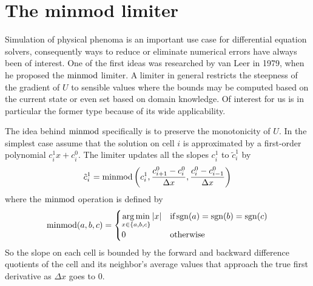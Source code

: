 \section{The minmod limiter}
\label{sec:minmod}

Simulation of physical phenoma is an important use case for differential equation solvers, consequently ways to reduce or eliminate numerical errors have always been of interest.
One of the first ideas was researched by van Leer in 1979, when he proposed the $\operatorname{minmod}$ limiter\cite{VanLeer1979}.
A limiter in general restricts the steepness of the gradient of $U$ to sensible values where the bounds may be computed based on the current state or even set based on domain knowledge.
Of interest for us is in particular the former type because of its wide applicability.

The idea behind $\operatorname{minmod}$ specifically is to preserve the monotonicity of $U$.
In the simplest case assume that the solution on cell $i$ is approximated by a first-order polynomial $c_{i}^{1}x + c_{i}^{0}$.
The limiter updates all the slopes $c_{i}^{1}$ to $\tilde{c}_{i}^{1}$ by
\begin{equation*}
  \tilde{c}_{i}^{1} = \operatorname{minmod}\left( c_{i}^{1}, \frac{c_{i + 1}^{0} - c_{i}^{0}}{\Delta x}, \frac{c_{i}^{0} - c_{i - 1}^{0}}{\Delta x} \right)
\end{equation*}
where the $\operatorname{minmod}$ operation is defined by
\begin{equation*}
  \operatorname{minmod}(a, b, c) = \begin{cases}
    \displaystyle\operatorname*{arg\,min}_{x \in \{ a, b, c \}} |x| & \text{if} \operatorname{sgn}(a) = \operatorname{sgn}(b) = \operatorname{sgn}(c)\\
    0 & \text{otherwise}
  \end{cases}
\end{equation*}
So the slope on each cell is bounded by the forward and backward difference quotients of the cell and its neighbor's average values that approach the true first derivative as $\Delta x$ goes to $0$.

